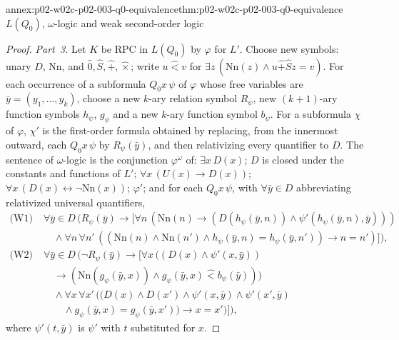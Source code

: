 \begin{annexitem}{annex:p02-w02c-p02-003-q0-equivalence}{thm:p02-w02c-p02-003-q0-equivalence}{\(L(Q_0)\), \(\omega\)-logic and weak second-order logic}
\begin{proof}
\emph{Part~3.}  Let \(K\) be RPC in \(L(Q_0)\) by \(\varphi\) for \(L'\).
Choose new symbols: unary \(D\), \(\mathrm{Nn}\), and \(\hat0,\hat S,\hat+,
\hat\times\); write \(u\mathbin{\hat<}v\) for
\(\exists z\,(\mathrm{Nn}(z)\land u\mathbin{\hat+}\hat Sz=v)\).  For each
occurrence of a subformula \(Q_0x\,\psi\) of \(\varphi\) whose free
variables are \(\bar y=(y_1,\ldots,y_k)\), choose a new \(k\)-ary relation
symbol \(R_\psi\), new \((k+1)\)-ary function symbols \(h_\psi\), \(g_\psi\)
and a new \(k\)-ary function symbol \(b_\psi\).  For a subformula \(\chi\)
of \(\varphi\), \(\chi'\) is the first-order formula obtained by replacing,
from the innermost outward, each \(Q_0x\,\psi\) by \(R_\psi(\bar y)\), and
then relativizing every quantifier to \(D\).  The sentence of
\(\omega\)-logic is the conjunction \(\varphi^{\omega}\) of: \(\exists
x\,D(x)\); \(D\) is closed under the constants and functions of \(L'\);
\(\forall x\,(U(x)\to D(x))\); \(\forall x\,(D(x)\leftrightarrow\neg
\mathrm{Nn}(x))\); \(\varphi'\); and for each \(Q_0x\,\psi\), with
\(\forall\bar y\in D\) abbreviating relativized universal quantifiers,
\begin{align*}
 \text{(W1)}\;&\forall\bar y\in D\,\bigl(R_\psi(\bar y)\to\bigl[\forall n\,(\mathrm{Nn}(n)\to
   (D(h_\psi(\bar y,n))\land\psi'(h_\psi(\bar y,n),\bar y)))\\
 &\quad{}\land\forall n\,\forall n'\,((\mathrm{Nn}(n)\land\mathrm{Nn}(n')\land
   h_\psi(\bar y,n)=h_\psi(\bar y,n'))\to n=n')\bigr]\bigr),\\
 \text{(W2)}\;&\forall\bar y\in D\,\bigl(\neg R_\psi(\bar y)\to\bigl[\forall x\,((D(x)\land\psi'(x,\bar y))\\
 &\quad{}\to(\mathrm{Nn}(g_\psi(\bar y,x))\land g_\psi(\bar y,x)\mathbin{\hat<}b_\psi(\bar y)))\\
 &\quad{}\land\forall x\,\forall x'\,((D(x)\land D(x')\land\psi'(x,\bar y)\land\psi'(x',\bar y)\\
 &\qquad{}\land g_\psi(\bar y,x)=g_\psi(\bar y,x'))\to x=x')\bigr]\bigr),
\end{align*}
where \(\psi'(t,\bar y)\) is \(\psi'\) with \(t\) substituted for \(x\).


\end{proof}
\end{annexitem}
